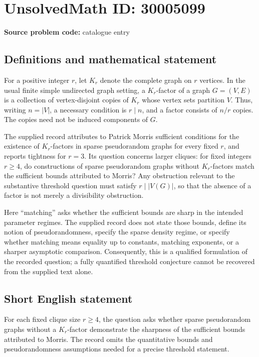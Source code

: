 \documentclass[11pt]{article}
\begin{document}
\section*{UnsolvedMath ID: 30005099}
\textbf{Source problem code:} catalogue entry
\subsection{Definitions and mathematical statement}
For a positive integer \(r\), let \(K_r\) denote the complete graph on \(r\) vertices. In the usual finite simple undirected graph setting, a \(K_r\)-factor of a graph \(G=(V,E)\) is a collection of vertex-disjoint copies of \(K_r\) whose vertex sets partition \(V\). Thus, writing \(n=|V|\), a necessary condition is \(r\mid n\), and a factor consists of \(n/r\) copies. The copies need not be induced components of \(G\).

The supplied record attributes to Patrick Morris sufficient conditions for the existence of \(K_r\)-factors in sparse pseudorandom graphs for every fixed \(r\), and reports tightness for \(r=3\). Its question concerns larger cliques: for fixed integers \(r\geq 4\), do constructions of sparse pseudorandom graphs without \(K_r\)-factors match the sufficient bounds attributed to Morris? Any obstruction relevant to the substantive threshold question must satisfy \(r\mid |V(G)|\), so that the absence of a factor is not merely a divisibility obstruction.

Here ``matching'' asks whether the sufficient bounds are sharp in the intended parameter regimes. The supplied record does not state those bounds, define its notion of pseudorandomness, specify the sparse density regime, or specify whether matching means equality up to constants, matching exponents, or a sharper asymptotic comparison. Consequently, this is a qualified formulation of the recorded question; a fully quantified threshold conjecture cannot be recovered from the supplied text alone.
\subsection{Short English statement}
For each fixed clique size \(r\geq 4\), the question asks whether sparse pseudorandom graphs without a \(K_r\)-factor demonstrate the sharpness of the sufficient bounds attributed to Morris. The record omits the quantitative bounds and pseudorandomness assumptions needed for a precise threshold statement.
\end{document}

